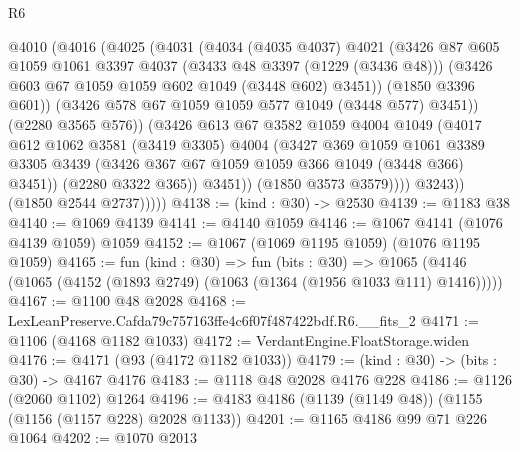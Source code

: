 \begin{lexlean}{R6}
\begin{coremodule}
                    @4010
                      (@4016
                        (@4025
                          (@4031
                            (@4034
                              (@4035 @4037)
                              @4021
                              (@3426
                                @87
                                @605
                                @1059
                                @1061
                                @3397
                                @4037
                                (@3433 @48 @3397 (@1229 (@3436 @48)))
                                (@3426 @603 @67 @1059 @1059 @602 @1049 (@3448 @602) @3451))
                              (@1850 @3396 @601))
                            (@3426 @578 @67 @1059 @1059 @577 @1049 (@3448 @577) @3451))
                          (@2280 @3565 @576))
                        (@3426
                          @613
                          @67
                          @3582
                          @1059
                          @4004
                          @1049
                          (@4017
                            @612
                            @1062
                            @3581
                            (@3419 @3305)
                            @4004
                            (@3427
                              @369
                              @1059
                              @1061
                              @3389
                              @3305
                              @3439
                              (@3426 @367 @67 @1059 @1059 @366 @1049 (@3448 @366) @3451))
                            (@2280 @3322 @365))
                          @3451))
                      (@1850 @3573 @3579))))
                @3243))
            (@1850 @2544 @2737)))))
@4138 := (kind : @30) -> @2530
@4139 := @1183 @38
@4140 := @1069 @4139
@4141 := @4140 @1059
@4146 := @1067 @4141 (@1076 @4139 @1059) @1059
@4152 := @1067 (@1069 @1195 @1059) (@1076 @1195 @1059)
@4165 := fun (kind : @30) =>
  fun (bits : @30) =>
  @1065 (@4146 (@1065 (@4152 (@1893 @2749) (@1063 (@1364 (@1956 @1033 @111) @1416)))))
@4167 := @1100 @48 @2028
@4168 := LexLeanPreserve.Cafda79c757163ffe4c6f07f487422bdf.R6.__fits_2
@4171 := @1106 (@4168 @1182 @1033)
@4172 := VerdantEngine.FloatStorage.widen
@4176 := @4171 (@93 (@4172 @1182 @1033))
@4179 := (kind : @30) -> (bits : @30) -> @4167 @4176
@4183 := @1118 @48 @2028 @4176 @228
@4186 := @1126 (@2060 @1102) @1264
@4196 := @4183 @4186 (@1139 (@1149 @48)) (@1155 (@1156 (@1157 @228) @2028 @1133))
@4201 := @1165 @4186 @99 @71 @226 @1064
@4202 := @1070 @2013

\end{coremodule}
\end{lexlean}
